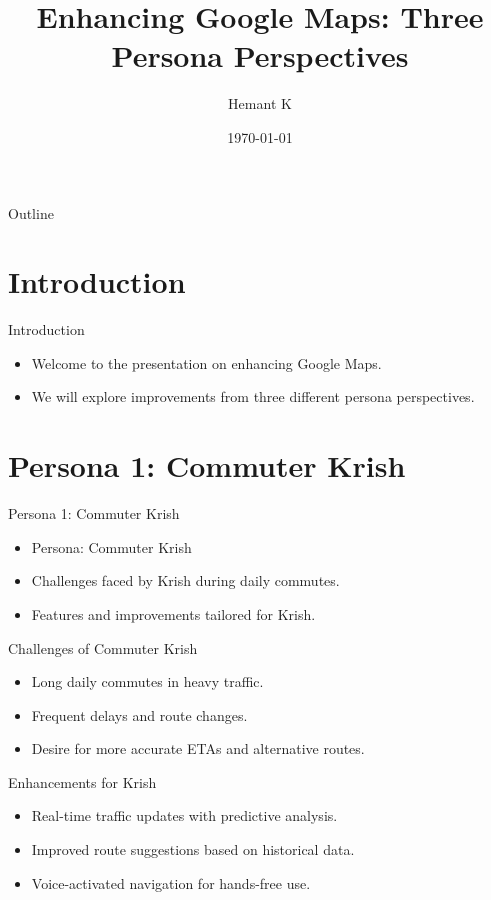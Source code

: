\documentclass[10pt, aspectratio=149]{beamer}
\title{Enhancing Google Maps: Three Persona Perspectives}
\date{\today}
\author{Hemant K}
\institute{NextLeap Product Manager Fellow}
\begin{document}
\maketitle

\begin{frame}{Outline}
  \tableofcontents
\end{frame}

\section{Introduction}

\begin{frame}{Introduction}
  \begin{itemize}
    \item Welcome to the presentation on enhancing Google Maps.
    \item We will explore improvements from three different persona perspectives.
  \end{itemize}
\end{frame}

\section{Persona 1: Commuter Krish}

\begin{frame}{Persona 1: Commuter Krish}
  \begin{itemize}
    \item Persona: Commuter Krish
    \item Challenges faced by Krish during daily commutes.
    \item Features and improvements tailored for Krish.
  \end{itemize}
\end{frame}

\begin{frame}{Challenges of Commuter Krish}
  \begin{itemize}
    \item Long daily commutes in heavy traffic.
    \item Frequent delays and route changes.
    \item Desire for more accurate ETAs and alternative routes.
  \end{itemize}
\end{frame}

\begin{frame}{Enhancements for Krish}
  \begin{itemize}
    \item Real-time traffic updates with predictive analysis.
    \item Improved route suggestions based on historical data.
    \item Voice-activated navigation for hands-free use.
  \end{itemize}
\end{frame}
\end{document}

